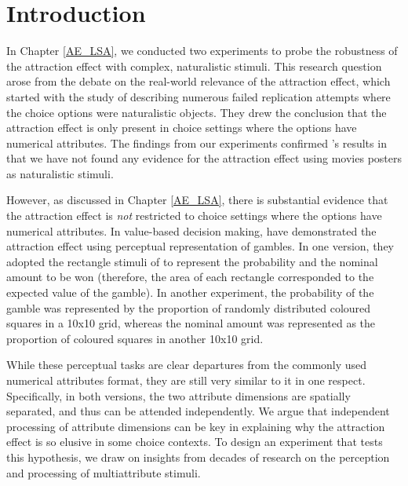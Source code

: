 \documentclass[11pt,a4paper]{article}
\date{}
\title{\huge{}}
\begin{document}
\maketitle


\section{Introduction} 

In Chapter \ref{AE_LSA}, we conducted two experiments to probe the robustness of the attraction effect with complex, naturalistic stimuli. This research question arose from the debate on the real-world relevance of the attraction effect, which started with the study of  describing numerous failed replication attempts where the choice options were naturalistic objects. They drew the conclusion that the attraction effect is only present in choice settings where the options have numerical attributes. The findings from our experiments confirmed \citeauthor{Frederick2014}'s results in that we have not found any evidence for the attraction effect using movies posters as naturalistic stimuli.

However, as discussed in Chapter  \ref{AE_LSA}, there is substantial evidence that the attraction effect is \textit{not} restricted to choice settings where the options have numerical attributes. In value-based decision making,  have demonstrated the attraction effect using perceptual representation of gambles. In one version, they adopted the rectangle stimuli of  to represent the probability and the nominal amount to be won (therefore, the area of each rectangle corresponded to the expected value of the gamble). In another experiment, the probability of the gamble was represented by the proportion of randomly distributed coloured squares in a 10x10 grid, whereas the nominal amount was represented as the proportion of coloured squares in another 10x10 grid. 

While these perceptual tasks are clear departures from the commonly used numerical attributes format, they are still very similar to it in one respect. Specifically, in both versions, the two attribute dimensions are spatially separated, and thus can be attended independently. We argue that independent processing of attribute dimensions can be key in explaining why the attraction effect is so elusive in some choice contexts. To design an experiment that tests this hypothesis, we draw on insights from decades of research on the perception and processing of multiattribute stimuli.
\end{document}
